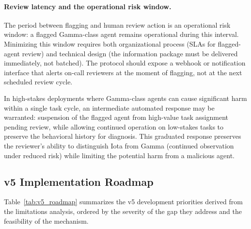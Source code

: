 \paragraph{Review latency and the operational risk window.}
The period between flagging and human review action is an operational risk window:
a flagged Gamma-class agent remains operational during this interval.  Minimizing
this window requires both organizational process (SLAs for flagged-agent review) and
technical design (the information package must be delivered immediately, not batched).
The protocol should expose a webhook or notification interface that alerts on-call
reviewers at the moment of flagging, not at the next scheduled review cycle.

In high-stakes deployments where Gamma-class agents can cause significant harm
within a single task cycle, an intermediate automated response may be warranted:
suspension of the flagged agent from high-value task assignment pending review,
while allowing continued operation on low-stakes tasks to preserve the behavioral
history for diagnosis.  This graduated response preserves the reviewer's ability
to distinguish Iota from Gamma (continued observation under reduced risk) while
limiting the potential harm from a malicious agent.

\subsection{v5 Implementation Roadmap}
\label{sec:fw_roadmap}

Table~\ref{tab:v5_roadmap} summarizes the v5 development priorities derived from
the limitations analysis, ordered by the severity of the gap they address and
the feasibility of the mechanism.

